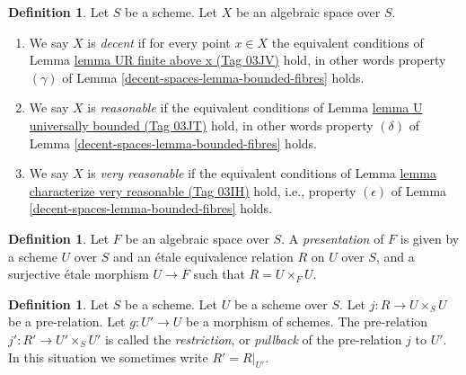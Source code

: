 \documentclass{amsart}
\theoremstyle{plain}
\theoremstyle{definition}
\newtheorem{definition}[subsection]{Definition}
\theoremstyle{remark}
\numberwithin{equation}{subsection}
\begin{document}
\begin{definition}
\label{decent-spaces-definition-very-reasonable}
Let $S$ be a scheme.
Let $X$ be an algebraic space over $S$.
\begin{enumerate}
\item We say $X$ is {\it decent} if for every point $x \in X$ the equivalent
conditions of
Lemma \href{https://stacks.math.columbia.edu/tag/03JV}{lemma UR finite above x (Tag 03JV)}
hold, in other words property $(\gamma)$ of
Lemma \ref{decent-spaces-lemma-bounded-fibres}
holds.
\item We say $X$ is {\it reasonable} if the equivalent conditions of
Lemma \href{https://stacks.math.columbia.edu/tag/03JT}{lemma U universally bounded (Tag 03JT)}
hold, in other words property $(\delta)$ of
Lemma \ref{decent-spaces-lemma-bounded-fibres}
holds.
\item We say $X$ is {\it very reasonable} if the equivalent conditions of
Lemma \href{https://stacks.math.columbia.edu/tag/03IH}{lemma characterize very reasonable (Tag 03IH)}
hold, i.e., property $(\epsilon)$ of
Lemma \ref{decent-spaces-lemma-bounded-fibres}
holds.
\end{enumerate}
\end{definition}

\begin{definition}
\label{spaces-definition-presentation}
Let $F$ be an algebraic space over $S$.
A {\it presentation} of $F$ is given by a scheme
$U$ over $S$ and an \'etale equivalence relation $R$ on $U$ over $S$, and
a surjective \'etale morphism $U \to F$ such that $R = U \times_F U$.
\end{definition}

\begin{definition}
\label{groupoids-definition-restrict-relation}
Let $S$ be a scheme.
Let $U$ be a scheme over $S$.
Let $j : R \to U \times_S U$ be a pre-relation.
Let $g : U' \to U$ be a morphism of schemes.
The pre-relation $j' : R' \to U' \times_S U'$ is called
the {\it restriction}, or {\it pullback} of the pre-relation $j$ to $U'$.
In this situation we sometimes write $R' = R|_{U'}$.
\end{definition}
\end{document}
